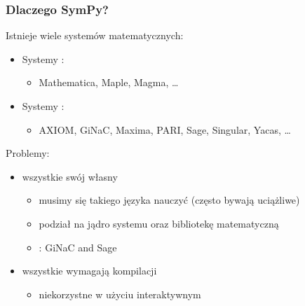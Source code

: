 \documentclass[10pt]{beamer}
\begin{document}
\begin{frame}[fragile]
    \frametitle{Dlaczego SymPy?}

    Istnieje wiele systemów matematycznych:
    \begin{itemize}
        \item Systemy :
            \begin{itemize}
                \item Mathematica, Maple, Magma, \ldots
            \end{itemize}
        \item Systemy :
            \begin{itemize}
                \item AXIOM, GiNaC, Maxima, PARI, Sage, Singular, Yacas, \ldots
            \end{itemize}
    \end{itemize}
    \pause
    {\color{red} Problemy:}
    \begin{itemize}
        \item wszystkie  swój własny 
            \begin{itemize}
                \item musimy się takiego języka nauczyć (często bywają uciążliwe)
                \item podział na jądro systemu oraz bibliotekę matematyczną
                \item {}: GiNaC and Sage
            \end{itemize}
        \pause
        \item wszystkie wymagają kompilacji
            \begin{itemize}
                \item niekorzystne w użyciu interaktywnym
            \end{itemize}
    \end{itemize}
\end{frame}
\end{document}
